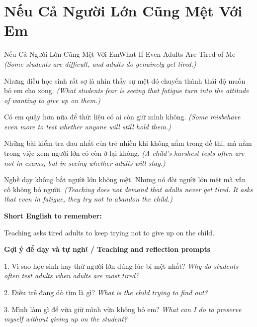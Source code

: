 \section{Nếu Cả Người Lớn Cũng Mệt Với Em}
\begin{truyen}{Nếu Cả Người Lớn Cũng Mệt Với Em}{What If Even Adults Are Tired of Me}
\textit{(Some students are difficult, and adults do genuinely get tired.)}

Nhưng điều học sinh rất sợ là nhìn thấy sự mệt đó chuyển thành thái độ muốn bỏ em cho xong.
\textit{(What students fear is seeing that fatigue turn into the attitude of wanting to give up on them.)}

Có em quậy hơn nữa để thử: liệu có ai còn giữ mình không.
\textit{(Some misbehave even more to test whether anyone will still hold them.)}

Những bài kiểm tra đau nhất của trẻ nhiều khi không nằm trong đề thi, mà nằm trong việc xem người lớn có còn ở lại không.
\textit{(A child's harshest tests often are not in exams, but in seeing whether adults will stay.)}

\end{truyen}

\begin{baihoc}
Nghề dạy không bắt người lớn không mệt. Nhưng nó đòi người lớn mệt mà vẫn cố không bỏ người.
\textit{(Teaching does not demand that adults never get tired. It asks that even in fatigue, they try not to abandon the child.)}
\end{baihoc}

\begin{ghinhoanh}
\textbf{Short English to remember:}

Teaching asks tired adults to keep trying not to give up on the child.

\end{ghinhoanh}

\begin{tuhocnhanh}
\textbf{Gợi ý để dạy và tự nghĩ / Teaching and reflection prompts}

1. Vì sao học sinh hay thử người lớn đúng lúc bị mệt nhất? \textit{Why do students often test adults when adults are most tired?}

2. Điều trẻ đang dò tìm là gì? \textit{What is the child trying to find out?}

3. Mình làm gì để vừa giữ mình vừa không bỏ em? \textit{What can I do to preserve myself without giving up on the student?}
\end{tuhocnhanh}
\ngancach

